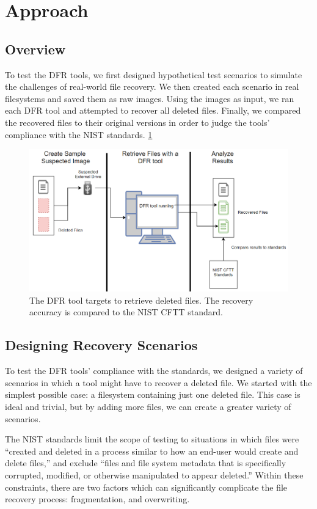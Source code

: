 \section{Approach}

\subsection{Overview}

To test the DFR tools, we first designed hypothetical test scenarios to simulate the challenges of real-world file recovery.
We then created each scenario in real filesystems and saved them as raw images. 
Using the images as input, we ran each DFR tool and attempted to recover all deleted files. 
Finally, we compared the recovered files to their original versions in order to judge the tools' compliance with the NIST standards.  \ref{fig:overview}

\begin{figure}[h]
    \centering
    \includegraphics[width=\linewidth]{fig/overview.png}
    \caption{The DFR tool targets to retrieve deleted files. The recovery accuracy is compared to the NIST CFTT standard.}
    \label{fig:overview}
\end{figure}

\subsection{Designing Recovery Scenarios}
To test the DFR tools' compliance with the standards, we designed a variety of scenarios in which a tool might have to recover a deleted file. 
We started with the simplest possible case: a filesystem containing just one deleted file. 
This case is ideal and trivial, but by adding more files, we can create a greater variety of scenarios.

The NIST standards limit the scope of testing to situations in which files were ``created and deleted in a process similar to how an end-user would create and delete files,''\cite{meta:dfr:standards} and exclude ``files and file system metadata that is specifically corrupted, modified, or otherwise manipulated to appear deleted.''\cite{meta:dfr:standards}
Within these constraints, there are two factors which can significantly complicate the file recovery process: fragmentation, and overwriting. 


